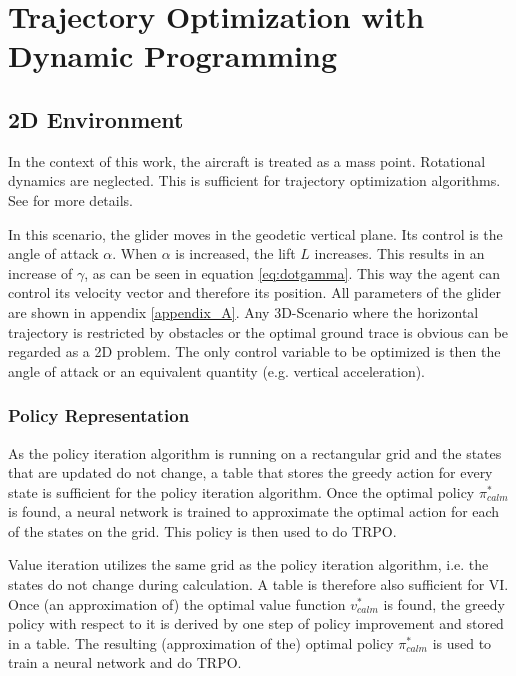 \chapter{Trajectory Optimization with Dynamic Programming}
\label{chapter5}
\section{2D Environment}

In the context of this work, the aircraft is treated as a mass point. Rotational dynamics are neglected. This is sufficient for trajectory optimization algorithms. See \cite{Fichter2009} for more details. 


In this scenario, the glider moves in the geodetic vertical plane. Its control is the angle of attack $\alpha$. When $\alpha$ is increased, the lift $L$ increases. This results in an increase of $\gamma$, as can be seen in equation \ref{eq:dotgamma}. This way the agent can control its velocity vector and therefore its position. All parameters of the glider are shown in appendix \ref{appendix_A}. Any 3D-Scenario where the horizontal trajectory is restricted by obstacles or the optimal ground trace is obvious can be regarded as a 2D problem. The only control variable to be optimized is then the angle of attack or an equivalent quantity (e.g. vertical acceleration).

\subsection{Policy Representation}

As the policy iteration algorithm is running on a rectangular grid and the states that are updated do not change, a table that stores the greedy action for every state is sufficient for the policy iteration algorithm. Once the optimal policy $\pi_{calm}^*$ is found, a neural network is trained to approximate the optimal action for each of the states on the grid. This policy is then used to do TRPO.

Value iteration utilizes the same grid as the policy iteration algorithm, i.e. the states do not change during calculation. A table is therefore also sufficient for VI. Once (an approximation of) the optimal value function $v_{calm}^*$ is found, the greedy policy with respect to it is derived by one step of policy improvement and stored in a table. The resulting (approximation of the) optimal policy $\pi_{calm}^*$ is used to train a neural network and do TRPO.

